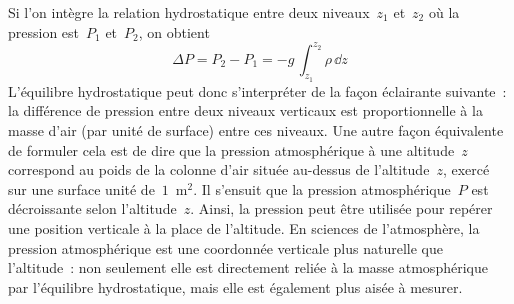 \sk
Si l'on intègre la relation hydrostatique entre deux niveaux~$z_1$ et~$z_2$ où la pression est~$P_1$ et~$P_2$, on obtient
\[ \Delta P = P_2 - P_1 = - g \, \int_{z_1}^{z_2} \rho \, \dd z \]
L'équilibre hydrostatique peut donc s'interpréter de la façon éclairante suivante~: la différence de pression entre deux niveaux verticaux est proportionnelle à la masse d'air (par unité de surface) entre ces niveaux. Une autre façon équivalente de formuler cela est de dire que la pression atmosphérique à une altitude~$z$ correspond au poids de la colonne d'air située au-dessus de l'altitude~$z$, exercé sur une surface unité de~$1$~m$^2$. Il s'ensuit que la pression atmosphérique~$P$ est décroissante selon l'altitude~$z$. Ainsi, la pression peut être utilisée pour repérer une position verticale à la place de l'altitude. En sciences de l'atmosphère, la pression atmosphérique est une coordonnée verticale plus naturelle que l'altitude~: non seulement elle est directement reliée à la masse atmosphérique par l'équilibre hydrostatique, mais elle est également plus aisée à mesurer.
